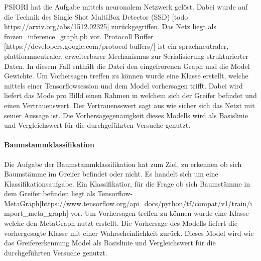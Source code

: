 	PSIORI hat die Aufgabe mittels neuronalem Netzwerk gelöst. Dabei  wurde auf die Technik des Single Shot MultiBox Detector (SSD) [todo https://arxiv.org/abs/1512.02325] zurückgegriffen. Das Netz liegt als frozen\_inference\_graph.pb vor.  Protocoll Buffer  [https://developers.google.com/protocol-buffers/] ist ein sprachneutraler, plattformneutraler, erweiterbarer Mechanismus zur Serialisierung strukturierter Daten. In diesem Fall enthält die Datei den eingefrorenen Graph und die Model Gewichte. Um Vorhersagen treffen zu können wurde eine Klasse erstellt, welche mittels einer Tensorflowsession und dem Model vorhersagen trifft.  Dabei wird liefert das Mode pro Billd einen Rahmen in welchem sich der Greifer befindet und einen Vertrauenswert. Der Vertrauensswert sagt aus wie sicher sich das Netzt mit seiner Aussage ist. Die Vorhersagegenauigkeit dieses Modells wird als Basislinie und Vergleichswert für die durchgeführten Versuche genutzt.
		
	\paragraph{Baumstammklassifikation} Die Aufgabe der Baumstammklassifikation hat zum Ziel, zu erkennen ob sich Baumstämme im Greifer befindet oder nicht. Es handelt sich um eine Klassifikationsaufgabe.
	Ein Klassifikatior, für die Frage ob sich Baumstämme in dem Greifer befinden liegt als Tensorflow-MetaGraph[https://www.tensorflow.org/api\_docs/python/tf/compat/v1/train/import\_meta\_graph] vor. Um Vorhersagen treffen zu können wurde eine Klasse welche den MetaGraph nutzt erstellt. Die Vorhersage des Modells liefert die vorhergesagte Klasse mit einer Wahrscheinlichkeit zurück. Dieses Model wird wie das Greifererkennung Model  als Basislinie und Vergleichswert für die durchgeführten Versuche genutzt.


